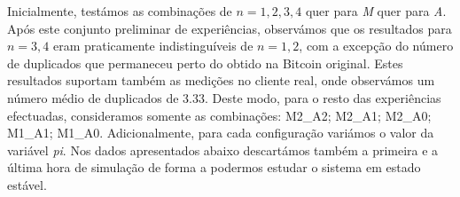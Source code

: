 Inicialmente, testámos as combinações de $n={1,2,3,4}$ quer para \textsl{M} quer para \textsl{A}.
Após este conjunto preliminar de experiências, observámos que os resultados para $n={3,4}$ eram praticamente indistinguíveis de $n={1,2}$, com a excepção do número de duplicados que permaneceu perto do obtido na Bitcoin original.
Estes resultados suportam também as medições no cliente real, onde observámos um número médio de duplicados de $3.33$. 
Deste modo, para o resto das experiências efectuadas, consideramos somente as combinações:
%
M2\_A2;
M2\_A1;
M2\_A0;
M1\_A1;
M1\_A0.
Adicionalmente, para cada configuração variámos o valor da variável \textsl{pi}.
Nos dados apresentados abaixo descartámos também a primeira e a última hora de simulação de forma a podermos estudar o sistema em estado estável.
\vspace{-0.7cm}

